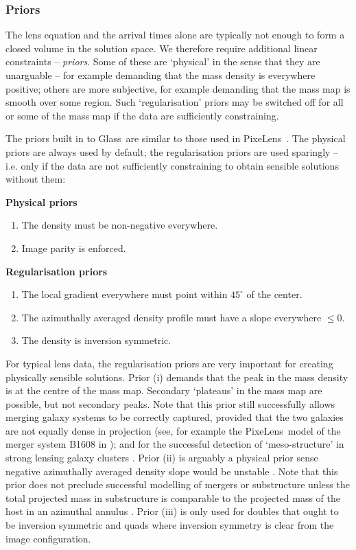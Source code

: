 \documentclass[galley,usenatbib]{mn2e}
\newcommand{\Glass}{{\sc Glass}}
\newcommand{\PixeLens}{{\sc PixeLens}}
\begin{document}
\subsubsection{Priors}

The lens equation and the arrival times alone are typically not enough to form a closed
volume in the solution space. We therefore require additional linear
constraints -- {\it priors}. Some of these are `physical' in the sense that they are unarguable -- for example demanding that the mass density is everywhere positive; others are more subjective, for example demanding that the mass map is smooth over some region. Such `regularisation' priors may be switched off for all or some of the mass map if the data are sufficiently constraining. 

The priors built in to \Glass\ are similar to those used in \PixeLens\ \citep{2008ApJ...679...17C}. The physical priors are always used by default; the regularisation priors are used sparingly -- i.e. only if the data are not sufficiently constraining to obtain sensible solutions without them:  

%
\vspace{2mm}
\noindent
{\bf Physical priors}
\begin{enumerate}
\item The density must be non-negative everywhere.
\item Image parity is enforced.
\end{enumerate}

\vspace{1mm}
\noindent
{\bf Regularisation priors}
\begin{enumerate}
\item The local gradient everywhere must point within $45^{\circ}$ of the center.
\item The azimuthally averaged density profile must have a slope everywhere $\le 0$.
\item The density is inversion symmetric.
\end{enumerate}
For typical lens data, the regularisation priors are very important for creating physically
sensible solutions. Prior (i) demands that the peak in the mass density is at the centre of the mass map. Secondary `plateaus' in the mass map are possible, but not secondary peaks. Note that this prior still successfully allows merging galaxy systems to be correctly captured, provided that the two galaxies are not equally dense in projection (see, for example the \PixeLens\ model of the merger system B1608 in \citealt{2007ApJ...667..645R}); and for the successful detection of `meso-structure' in strong lensing galaxy clusters \citep{2007ApJ...663...29S}. Prior (ii) is arguably a physical prior sense negative azimuthally averaged density slope would be unstable \citep[e.g.][]{2008gady.book.....B}. Note that this prior does not preclude successful modelling of mergers or substructure unless the total projected mass in substructure is comparable to the projected mass of the host in an azimuthal annulus \citep{2007ApJ...667..645R,2007ApJ...663...29S}. Prior (iii) is only used for doubles that ought to be inversion symmetric and quads where inversion symmetry is clear from the image configuration.
\end{document}
